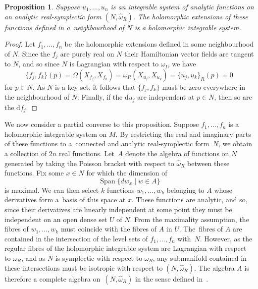 \documentclass[pdftex]{sigma}
\numberwithin{equation}{section}
\newtheorem{Proposition}[Theorem]{Proposition}
 { \theoremstyle{definition}
\newtheorem{Definition}[Theorem]{Definition}
\newtheorem{Note}[Theorem]{Note}
\newtheorem{Example}[Theorem]{Example}
\newtheorem{Remark}[Theorem]{Remark} }
\DeclareMathOperator{\Span}{Span}
\begin{document}
\begin{Proposition}%
Suppose $u_1,\dots,u_n$ is an integrable system of analytic functions on an analytic real-symplectic form $(N,\widehat{\omega}_R)$. The holomorphic extensions of these functions defined in a~neighbourhood of $N$ is a holomorphic integrable system.
\end{Proposition}
\begin{proof}
	Let $f_1,\dots,f_n$ be the holomorphic extensions defined in some neighbourhood of $N$. Since the $f_j$ are purely real on $N$ their Hamiltonian vector fields are tangent to $N$, and so since $N$ is Lagrangian with respect to $\omega_I$, we have
	\[
	\{f_j,f_k\}(p)=\Omega(X_{f_j},X_{f_k})=\omega_R(X_{u_j},X_{u_k})=\{u_j,u_k\}_R(p)=0
	\]
	for $p\in N$. As $N$ is a key set, it follows that $\{f_j,f_k\}$ must be zero everywhere in the neighbourhood of $N$. Finally, if the $\mathrm{d}u_j$ are independent at $p\in N$, then so are the $\mathrm{d}f_j$.
\end{proof}

We now consider a partial converse to this proposition. Suppose $f_1,\dots,f_n$ is a holomorphic integrable system on $M$. By restricting the real and imaginary parts of these functions to a~connected and analytic real-symplectic form~$N$, we obtain a collection of $2n$ real functions. Let~${A}$ denote the algebra of functions on $N$ generated by taking the Poisson bracket with respect to $\widehat{\omega}_R$ between these functions. Fix some $x\in N$ for which the dimension of
\[
\Span\{dw_x\mid w\in{A}\}
\]
is maximal. We can then select $k$ functions $w_1,\dots,w_k$ belonging to ${A}$ whose derivatives form a~basis of this space at $x$. These functions are analytic, and so, since their derivatives are linearly independent at some point they must be independent on an open dense set $U$ of $N$. From the maximality assumption, the fibres of $w_1,\dots,w_k$ must coincide with the fibres of ${A}$ in $U$. The~fibres of ${A}$ are contained in the intersection of the level sets of $f_1,\dots,f_n$ with~$N$. However, as the regular fibres of the holomorphic integrable system are Lagrangian with respect to $\omega_R$, and as $N$ is symplectic with respect to $\omega_R$, any submanifold contained in these intersections must be isotropic with respect to $(N,\widehat{\omega}_R)$. The algebra $A$ is therefore a complete algebra on~$(N,\widehat{\omega}_R)$ in the sense defined in~\cite{bols}.
\end{document}
